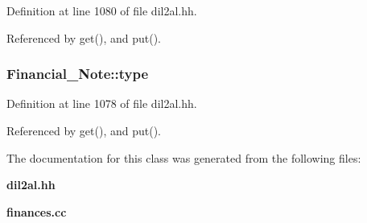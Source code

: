 Definition at line 1080 of file dil2al.hh.

Referenced by get(), and put().
\subsubsection{ Financial\_\-Note::type\hspace{0.3cm}{\tt  [protected]}}\label{classFinancial__Note_n2}




Definition at line 1078 of file dil2al.hh.

Referenced by get(), and put().

The documentation for this class was generated from the following files:\begin{CompactItemize}
\item 
{\bf dil2al.hh}\item 
{\bf finances.cc}\end{CompactItemize}
